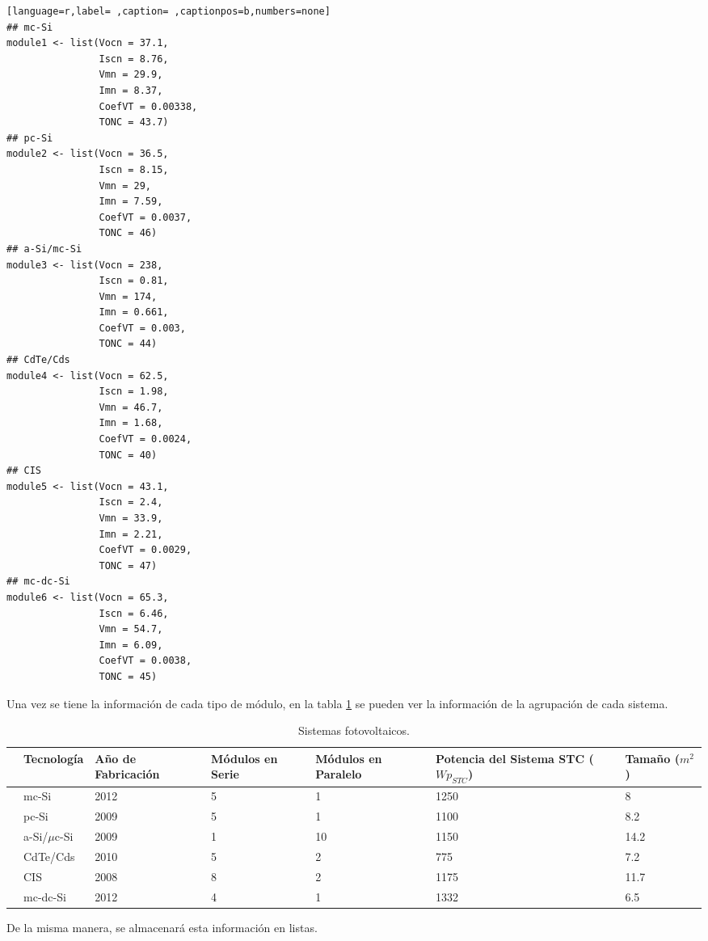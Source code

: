 \begin{lstlisting}[language=r,label= ,caption= ,captionpos=b,numbers=none]
## mc-Si
module1 <- list(Vocn = 37.1,
                Iscn = 8.76,
                Vmn = 29.9,
                Imn = 8.37,
                CoefVT = 0.00338,
                TONC = 43.7)
## pc-Si
module2 <- list(Vocn = 36.5,
                Iscn = 8.15,
                Vmn = 29,
                Imn = 7.59,
                CoefVT = 0.0037,
                TONC = 46)
## a-Si/mc-Si
module3 <- list(Vocn = 238,
                Iscn = 0.81,
                Vmn = 174,
                Imn = 0.661,
                CoefVT = 0.003,
                TONC = 44)
## CdTe/Cds
module4 <- list(Vocn = 62.5,
                Iscn = 1.98,
                Vmn = 46.7,
                Imn = 1.68,
                CoefVT = 0.0024,
                TONC = 40)
## CIS
module5 <- list(Vocn = 43.1,
                Iscn = 2.4,
                Vmn = 33.9,
                Imn = 2.21,
                CoefVT = 0.0029,
                TONC = 47)
## mc-dc-Si
module6 <- list(Vocn = 65.3,
                Iscn = 6.46,
                Vmn = 54.7,
                Imn = 6.09,
                CoefVT = 0.0038,
                TONC = 45)
\end{lstlisting}

Una vez se tiene la información de cada tipo de módulo, en la tabla \ref{tab:sistemas-fotovoltaicos} se pueden ver la información de la agrupación de cada sistema.
\begin{center}
{\footnotesize }%
\begin{table}
{\scriptsize \caption{Sistemas fotovoltaicos.\label{tab:sistemas-fotovoltaicos}}}
\centering{}{\scriptsize }\begin{tabular}{*{7}{>{\centering}m{1.85cm}}}
\toprule 
{\scriptsize \textbf{Sistema}} & {\scriptsize \textbf{Tecnología}} & {\scriptsize \textbf{Año de Fabricación}} & {\scriptsize \textbf{Módulos en Serie}} & {\scriptsize \textbf{Módulos en Paralelo}} & {\scriptsize \textbf{Potencia del Sistema STC ($Wp_{STC}$)}} & {\scriptsize \textbf{Tamaño ($m^2$)}}\tabularnewline
\midrule
{\scriptsize 1} & {\scriptsize mc-Si} & {\scriptsize 2012} & {\scriptsize 5} & {\scriptsize 1} & {\scriptsize 1250} & {\scriptsize 8}\tabularnewline
{\scriptsize 2} & {\scriptsize pc-Si} & {\scriptsize 2009} & {\scriptsize 5} & {\scriptsize 1} & {\scriptsize 1100} & {\scriptsize 8.2}\tabularnewline
{\scriptsize 3} & {\scriptsize a-Si/$\mu$c-Si} & {\scriptsize 2009} & {\scriptsize 1} & {\scriptsize 10} & {\scriptsize 1150} & {\scriptsize 14.2}\tabularnewline
{\scriptsize 4} & {\scriptsize CdTe/Cds} & {\scriptsize 2010} & {\scriptsize 5} & {\scriptsize 2} & {\scriptsize 775} & {\scriptsize 7.2}\tabularnewline
{\scriptsize 5} & {\scriptsize CIS} & {\scriptsize 2008} & {\scriptsize 8} & {\scriptsize 2} & {\scriptsize 1175} & {\scriptsize 11.7}\tabularnewline
{\scriptsize 6} & {\scriptsize mc-dc-Si} & {\scriptsize 2012} & {\scriptsize 4} & {\scriptsize 1} & {\scriptsize 1332} & {\scriptsize 6.5}\tabularnewline
\bottomrule
\end{tabular}
\end{table}
\end{center}
De la misma manera, se almacenará esta información en listas.

